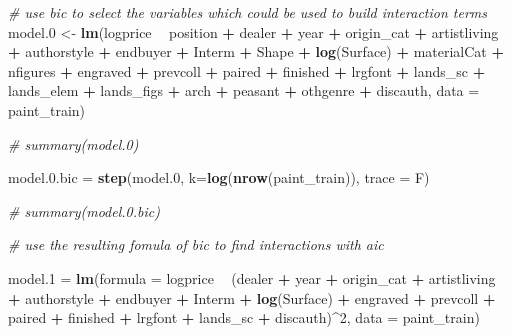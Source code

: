 \documentclass[]{article}
\newenvironment{Shaded}{\begin{snugshade}}{\end{snugshade}}
\newcommand{\CommentTok}[1]{\textcolor[rgb]{0.56,0.35,0.01}{\textit{#1}}}
\newcommand{\DataTypeTok}[1]{\textcolor[rgb]{0.13,0.29,0.53}{#1}}
\newcommand{\DecValTok}[1]{\textcolor[rgb]{0.00,0.00,0.81}{#1}}
\newcommand{\FloatTok}[1]{\textcolor[rgb]{0.00,0.00,0.81}{#1}}
\newcommand{\KeywordTok}[1]{\textcolor[rgb]{0.13,0.29,0.53}{\textbf{#1}}}
\newcommand{\NormalTok}[1]{#1}
\newcommand{\OperatorTok}[1]{\textcolor[rgb]{0.81,0.36,0.00}{\textbf{#1}}}
\newcommand{\StringTok}[1]{\textcolor[rgb]{0.31,0.60,0.02}{#1}}
\begin{document}
\begin{Shaded}
\begin{Highlighting}[]
\CommentTok{# use bic to select the variables which could be used to build interaction terms}
\NormalTok{model}\FloatTok{.0}\NormalTok{ <-}\StringTok{ }\KeywordTok{lm}\NormalTok{(logprice }\OperatorTok{~}\StringTok{ }\NormalTok{position }\OperatorTok{+}\StringTok{ }\NormalTok{dealer }\OperatorTok{+}\StringTok{ }\NormalTok{year }\OperatorTok{+}\StringTok{ }\NormalTok{origin_cat }\OperatorTok{+}\StringTok{ }\NormalTok{artistliving }\OperatorTok{+}\StringTok{ }
\StringTok{    }\NormalTok{authorstyle }\OperatorTok{+}\StringTok{ }\NormalTok{endbuyer }\OperatorTok{+}\StringTok{ }\NormalTok{Interm }\OperatorTok{+}\StringTok{ }\NormalTok{Shape }\OperatorTok{+}\StringTok{ }\KeywordTok{log}\NormalTok{(Surface) }\OperatorTok{+}\StringTok{ }\NormalTok{materialCat }\OperatorTok{+}\StringTok{ }
\StringTok{    }\NormalTok{nfigures }\OperatorTok{+}\StringTok{ }\NormalTok{engraved }\OperatorTok{+}\StringTok{ }\NormalTok{prevcoll }\OperatorTok{+}\StringTok{ }\NormalTok{paired }\OperatorTok{+}\StringTok{ }\NormalTok{finished }\OperatorTok{+}\StringTok{ }\NormalTok{lrgfont }\OperatorTok{+}\StringTok{ }
\StringTok{    }\NormalTok{lands_sc }\OperatorTok{+}\StringTok{ }\NormalTok{lands_elem }\OperatorTok{+}\StringTok{ }\NormalTok{lands_figs }\OperatorTok{+}\StringTok{ }\NormalTok{arch }\OperatorTok{+}\StringTok{ }\NormalTok{peasant }\OperatorTok{+}\StringTok{ }\NormalTok{othgenre }\OperatorTok{+}\StringTok{ }
\StringTok{    }\NormalTok{discauth, }\DataTypeTok{data =}\NormalTok{ paint_train)}

\CommentTok{# summary(model.0)}

\NormalTok{model.}\FloatTok{0.}\NormalTok{bic =}\StringTok{ }\KeywordTok{step}\NormalTok{(model}\FloatTok{.0}\NormalTok{, }\DataTypeTok{k=}\KeywordTok{log}\NormalTok{(}\KeywordTok{nrow}\NormalTok{(paint_train)), }\DataTypeTok{trace =}\NormalTok{ F)}

\CommentTok{# summary(model.0.bic)}

\CommentTok{# use the resulting fomula of bic to find interactions with aic}

\NormalTok{model}\FloatTok{.1}\NormalTok{ =}\StringTok{ }\KeywordTok{lm}\NormalTok{(}\DataTypeTok{formula =}\NormalTok{ logprice }\OperatorTok{~}\StringTok{ }\NormalTok{(dealer }\OperatorTok{+}\StringTok{ }\NormalTok{year }\OperatorTok{+}\StringTok{ }\NormalTok{origin_cat }\OperatorTok{+}\StringTok{ }\NormalTok{artistliving }\OperatorTok{+}\StringTok{ }
\StringTok{    }\NormalTok{authorstyle }\OperatorTok{+}\StringTok{ }\NormalTok{endbuyer }\OperatorTok{+}\StringTok{ }\NormalTok{Interm }\OperatorTok{+}\StringTok{ }\KeywordTok{log}\NormalTok{(Surface) }\OperatorTok{+}\StringTok{ }\NormalTok{engraved }\OperatorTok{+}\StringTok{ }\NormalTok{prevcoll }\OperatorTok{+}\StringTok{ }
\StringTok{    }\NormalTok{paired }\OperatorTok{+}\StringTok{ }\NormalTok{finished }\OperatorTok{+}\StringTok{ }\NormalTok{lrgfont }\OperatorTok{+}\StringTok{ }\NormalTok{lands_sc }\OperatorTok{+}\StringTok{ }\NormalTok{discauth)}\OperatorTok{^}\DecValTok{2}\NormalTok{, }\DataTypeTok{data =}\NormalTok{ paint_train)}


\end{Highlighting}
\end{Shaded}
\end{document}
